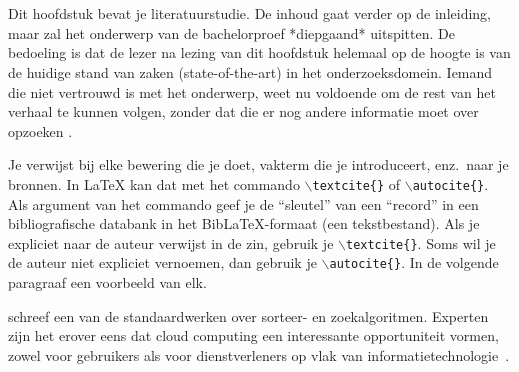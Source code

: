 \chapter{}%
\label{ch:stand-van-zaken}



Dit hoofdstuk bevat je literatuurstudie. De inhoud gaat verder op de inleiding, maar zal het onderwerp van de bachelorproef *diepgaand* uitspitten. De bedoeling is dat de lezer na lezing van dit hoofdstuk helemaal op de hoogte is van de huidige stand van zaken (state-of-the-art) in het onderzoeksdomein. Iemand die niet vertrouwd is met het onderwerp, weet nu voldoende om de rest van het verhaal te kunnen volgen, zonder dat die er nog andere informatie moet over opzoeken \autocite{Pollefliet2011}.

Je verwijst bij elke bewering die je doet, vakterm die je introduceert, enz.\ naar je bronnen. In \LaTeX{} kan dat met het commando \texttt{$\backslash${textcite\{\}}} of \texttt{$\backslash${autocite\{\}}}. Als argument van het commando geef je de ``sleutel'' van een ``record'' in een bibliografische databank in het Bib\LaTeX{}-formaat (een tekstbestand). Als je expliciet naar de auteur verwijst in de zin, gebruik je \texttt{$\backslash${}textcite\{\}}.
Soms wil je de auteur niet expliciet vernoemen, dan gebruik je \texttt{$\backslash${}autocite\{\}}. In de volgende paragraaf een voorbeeld van elk.

\textcite{Knuth1998} schreef een van de standaardwerken over sorteer- en zoekalgoritmen. Experten zijn het erover eens dat cloud computing een interessante opportuniteit vormen, zowel voor gebruikers als voor dienstverleners op vlak van informatietechnologie~\autocite{Creeger2009}.
\pagebreak
